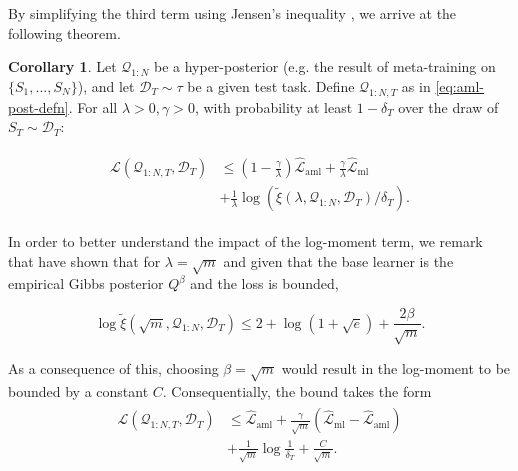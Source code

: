 \documentclass[letterpaper]{article} %
\theoremstyle{definition}
\newtheorem{corollary}[theorem]{Corollary}
\begin{document}
By simplifying the third term using Jensen's inequality , we arrive at the following theorem.

\begin{corollary} \label{thm:main-result-gibbs}
	Let $\mathcal{Q}_{1:N}$ be a hyper-posterior (e.g. the result of meta-training on $\{S_1,...,S_N\}$), and let $\mathcal{D}_T\sim \tau$ be a given test task. Define  $\mathcal{Q}_{1:N,T}$ as in \eqref{eq:aml-post-defn}. 
	For all $\lambda>0, \gamma>0$, 
	with probability at least $1-\delta_T$ over the draw of $S_T\sim \mathcal{D}_T$:
	
	\begin{align} \label{eq:pb-adapt-multi}
	\begin{split}
	\mathcal{L}(\mathcal{Q}_{1:N,T}, \mathcal{D}_T) &\leq 
	(1-\frac{\gamma}{\lambda})\hat{\mathcal{L}}_{\mathrm{aml}} + \frac{\gamma}{\lambda}\hat{\mathcal{L}}_{\mathrm{ml}} \\
	&+\frac{1}{\lambda}\log\left (\tilde{\xi}(\lambda,\mathcal{Q}_{1:N},\mathcal{D}_T)/\delta_T\right ) .
	\end{split}
	\end{align}
\end{corollary}

In order to better understand the impact of the log-moment term, we remark that \citet{Rivasplata2020} have shown that for $\lambda=\sqrt{m}$ and given that the base learner is the empirical Gibbs posterior $Q^\beta$ and the loss is bounded,

$$\log\tilde{\xi}(\sqrt{m},\mathcal{Q}_{1:N},\mathcal{D}_T) \leq 2+\log(1+\sqrt{e})+\frac{2\beta}{\sqrt{m}} .$$

As a consequence of this, choosing $\beta=\sqrt{m}$ would result 
in the log-moment to be bounded by a constant $C$. Consequentially, the bound takes the form
    \begin{align*}
    \begin{split}
    \mathcal{L}(\mathcal{Q}_{1:N,T}, \mathcal{D}_T) &\leq \hat{\mathcal{L}}_{\mathrm{aml}} +
    \frac{\gamma}{\sqrt{m}}(\hat{\mathcal{L}}_{\mathrm{ml}}-\hat{\mathcal{L}}_{\mathrm{aml}}) \\
&+\frac{1}{\sqrt{m}}\log\frac{1}{\delta_T}+\frac{C}{\sqrt{m}} .
    \end{split}
    \end{align*}
\end{document}
